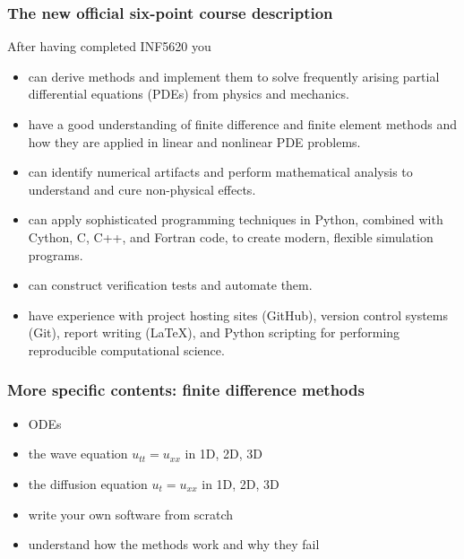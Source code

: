 \documentclass{beamer}
\begin{document}
\begin{frame}
\frametitle{The new official six-point course description}

After having completed INF5620 you

\begin{itemize}
\pause
 \item can derive methods and implement them to solve frequently
   arising partial differential equations (PDEs) from physics and mechanics.

\pause
 \item have a good understanding of finite difference and finite element
   methods and how they are applied in linear and nonlinear PDE problems.

\pause
 \item can identify numerical artifacts and perform mathematical analysis
   to understand and cure non-physical effects.

\pause
 \item can apply sophisticated programming techniques in Python, combined
   with Cython, C, C++, and Fortran code, to create modern,
   flexible simulation programs.

\pause
 \item can construct verification tests and automate them.

\pause
 \item have experience with project hosting sites (GitHub),
   version control systems (Git), report writing ({\LaTeX}),
   and Python scripting for performing reproducible computational science.
\end{itemize}

\noindent
\end{frame}

\begin{frame}
\frametitle{More specific contents: finite difference methods}

\begin{block}{}
\begin{itemize}
   \item ODEs

   \item the wave equation $u_{tt}=u_{xx}$ in 1D, 2D, 3D

   \item the diffusion equation $u_t=u_{xx}$ in 1D, 2D, 3D

   \item write your own software from scratch

   \item understand how the methods work and why they fail
\end{itemize}

\noindent
\end{block}
\end{frame}
\end{document}
